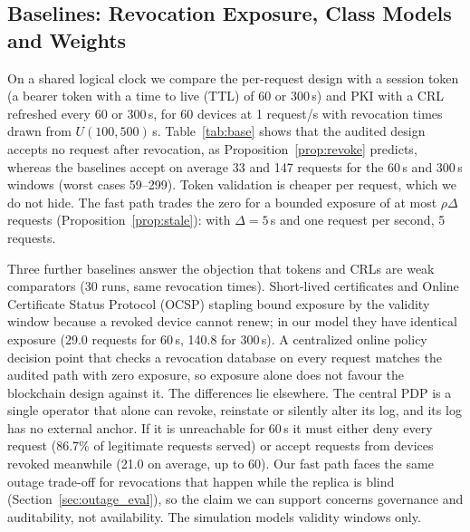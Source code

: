 \subsection{Baselines: Revocation Exposure, Class Models and Weights}\label{sec:baselines}
On a shared logical clock we compare the per-request design with a session token (a bearer token with a time to live (TTL) of 60 or 300\,s) and PKI with a CRL refreshed every 60 or 300\,s, for 60 devices at 1 request/s with revocation times drawn from $U(100,500)$\,s. Table~\ref{tab:base} shows that the audited design accepts no request after revocation, as Proposition~\ref{prop:revoke} predicts, whereas the baselines accept on average 33 and 147 requests for the 60\,s and 300\,s windows (worst cases 59--299). Token validation is cheaper per request, which we do not hide. The fast path trades the zero for a bounded exposure of at most $\rho\Delta$ requests (Proposition~\ref{prop:stale}): with $\Delta=5$\,s and one request per second, 5 requests.

\begin{table}[t]
\centering
\caption{Revocation exposure (requests accepted after revocation; 60 devices, 1 req/s) and mean decision latency}
\label{tab:base}
\scriptsize

\end{table}

Three further baselines answer the objection that tokens and CRLs are weak comparators (30 runs, same revocation times). Short-lived certificates and Online Certificate Status Protocol (OCSP) stapling bound exposure by the validity window because a revoked device cannot renew; in our model they have identical exposure (29.0 requests for 60\,s, 140.8 for 300\,s). A centralized online policy decision point that checks a revocation database on every request matches the audited path with zero exposure, so exposure alone does not favour the blockchain design against it. The differences lie elsewhere. The central PDP is a single operator that alone can revoke, reinstate or silently alter its log, and its log has no external anchor. If it is unreachable for 60\,s it must either deny every request (86.7\% of legitimate requests served) or accept requests from devices revoked meanwhile (21.0 on average, up to 60). Our fast path faces the same outage trade-off for revocations that happen while the replica is blind (Section~\ref{sec:outage_eval}), so the claim we can support concerns governance and auditability, not availability. The simulation models validity windows only.

